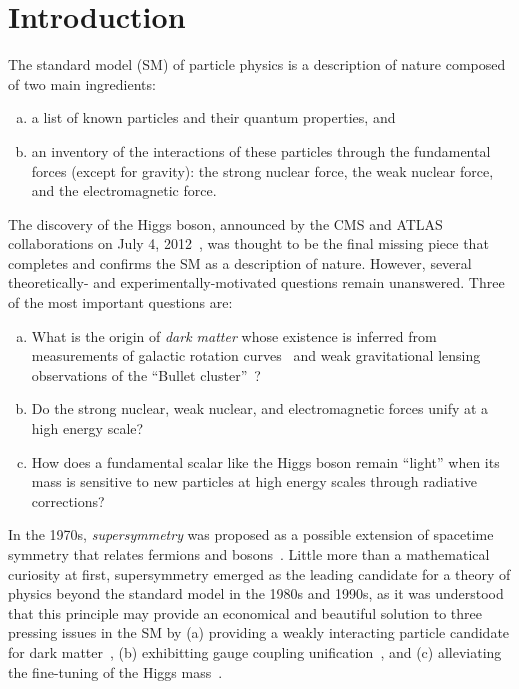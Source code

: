 \chapter{Introduction}
\label{ch:intro}

The standard model (SM) of particle physics is a description of nature
composed of two main ingredients:
\begin{enumerate}[(a)]
\item a list of known particles and their quantum properties, and
\item an inventory of the interactions of these particles through the fundamental forces
(except for gravity): the strong nuclear force, the weak nuclear force, and the electromagnetic
force. 
\end{enumerate}
The discovery of the Higgs boson, announced by the CMS and ATLAS
collaborations on July 4, 2012~\cite{CMShiggs,ATLAShiggs}, was
thought to be the final missing piece that completes and confirms the
SM as a description of nature. However, several theoretically- and
experimentally-motivated questions remain unanswered. Three
of the most important questions are:
\begin{enumerate}[(a)]
\item What is the origin of \emph{dark matter} whose existence is
  inferred from measurements of galactic rotation curves~\cite{1980ApJrotationcurves,1989HIrotationcurves} and weak gravitational lensing
  observations of the ``Bullet cluster''~\cite{Clowe:2006eq}?
\item Do the strong nuclear, weak nuclear, and electromagnetic
  forces unify at a high energy scale?
\item How does a fundamental scalar like the Higgs boson remain
  ``light'' when its mass is sensitive to new particles at high energy
  scales through radiative corrections?
\end{enumerate}

In the 1970s, \emph{supersymmetry} was proposed as a
possible extension of spacetime symmetry that relates fermions and
bosons~\cite{Ramond,Golfand,Volkov,Wess,Fayet}. Little
more than a mathematical curiosity at first, supersymmetry
emerged as the leading candidate for a theory of physics beyond the
standard model in the 1980s and 1990s, as it was understood that this 
principle may provide an economical and beautiful solution to
three pressing issues in the SM by (a) providing a weakly interacting particle candidate for dark
matter~\cite{Ellis:1983ew,Jungman:1995df}, (b) exhibitting gauge coupling
unification~\cite{Dimopoulos:1981yj,Marciano:1981un,Einhorn:1981sx,Ibanez:1981yh,Amaldi:1991cn,Langacker:1995fk},
and (c) alleviating the fine-tuning of the Higgs mass~\cite{Witten:1981nf,Dimopoulos:1981zb,Dine:1981za,Dimopoulos:1981au,Sakai:1981gr,Kaul:1981hi}.

